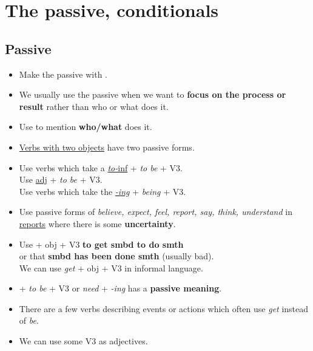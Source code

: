 \section{The passive, conditionals}

\subsection{Passive}
\begin{itemize}
    \item Make the passive with .
    \item We usually use the passive when we want to \textbf{focus on the process or result}
    rather than who or what does it.
    \item[\doot] Use  to mention \textbf{who/what} does it.
    \item[\doot] \underline{Verbs with two objects} have two passive forms.
    \item[\doot] Use verbs which take a \underline{\textit{to-}inf} + \textit{to be} + V3.\\
    Use \underline{adj} + \textit{to be} + V3.\\
    Use verbs which take the \underline{\textit{-ing}} + \textit{being} + V3.
    \item[\doot] Use passive forms of \textit{believe, expect, feel, report, say, think, understand}
    in \underline{reports} where there is some \textbf{uncertainty}.
    \item[\doot] Use  + obj + V3 \textbf{to get smbd to do smth}\\
    or that \textbf{smbd has been done smth} (usually bad).\\
    We can use \textit{get} + obj + V3 in informal language.
    \item[\doot]  + \textit{to be} + V3 or \textit{need} + \textit{-ing} has a \textbf{passive meaning}.
    \item[\aast] There are a few verbs describing events or actions which often use \textit{get} instead of \textit{be}.
    \item[\aast] We can use some V3 as adjectives.
\end{itemize}

